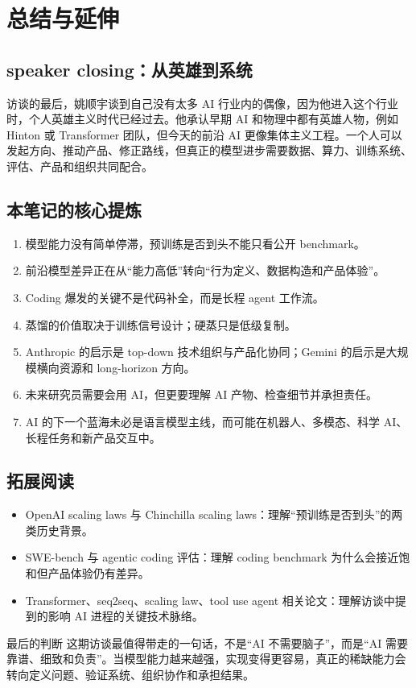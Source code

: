 \section{总结与延伸}

\subsection{ speaker closing：从英雄到系统}

访谈的最后，姚顺宇谈到自己没有太多 AI 行业内的偶像，因为他进入这个行业时，个人英雄主义时代已经过去。他承认早期 AI 和物理中都有英雄人物，例如 Hinton 或 Transformer 团队，但今天的前沿 AI 更像集体主义工程。一个人可以发起方向、推动产品、修正路线，但真正的模型进步需要数据、算力、训练系统、评估、产品和组织共同配合。

\subsection{本笔记的核心提炼}

\begin{enumerate}
\item 模型能力没有简单停滞，预训练是否到头不能只看公开 benchmark。
\item 前沿模型差异正在从“能力高低”转向“行为定义、数据构造和产品体验”。
\item Coding 爆发的关键不是代码补全，而是长程 agent 工作流。
\item 蒸馏的价值取决于训练信号设计；硬蒸只是低级复制。
\item Anthropic 的启示是 top-down 技术组织与产品化协同；Gemini 的启示是大规模横向资源和 long-horizon 方向。
\item 未来研究员需要会用 AI，但更要理解 AI 产物、检查细节并承担责任。
\item AI 的下一个蓝海未必是语言模型主线，而可能在机器人、多模态、科学 AI、长程任务和新产品交互中。
\end{enumerate}

\subsection{拓展阅读}

\begin{itemize}
\item OpenAI scaling laws 与 Chinchilla scaling laws：理解“预训练是否到头”的两类历史背景。
\item SWE-bench 与 agentic coding 评估：理解 coding benchmark 为什么会接近饱和但产品体验仍有差异。
\item Transformer、seq2seq、scaling law、tool use agent 相关论文：理解访谈中提到的影响 AI 进程的关键技术脉络。
\end{itemize}

\begin{importantbox}{最后的判断}
这期访谈最值得带走的一句话，不是“AI 不需要脑子”，而是“AI 需要靠谱、细致和负责”。当模型能力越来越强，实现变得更容易，真正的稀缺能力会转向定义问题、验证系统、组织协作和承担结果。
\end{importantbox}


